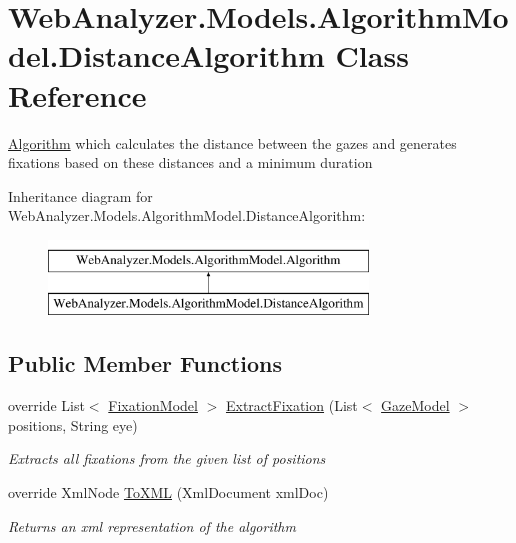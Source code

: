 \hypertarget{class_web_analyzer_1_1_models_1_1_algorithm_model_1_1_distance_algorithm}{}\section{Web\+Analyzer.\+Models.\+Algorithm\+Model.\+Distance\+Algorithm Class Reference}
\label{class_web_analyzer_1_1_models_1_1_algorithm_model_1_1_distance_algorithm}


\hyperlink{class_web_analyzer_1_1_models_1_1_algorithm_model_1_1_algorithm}{Algorithm} which calculates the distance between the gazes and generates fixations based on these distances and a minimum duration  


Inheritance diagram for Web\+Analyzer.\+Models.\+Algorithm\+Model.\+Distance\+Algorithm\+:\begin{figure}[H]
\begin{center}
\leavevmode
\includegraphics[height=2.000000cm]{class_web_analyzer_1_1_models_1_1_algorithm_model_1_1_distance_algorithm}
\end{center}
\end{figure}
\subsection*{Public Member Functions}
\begin{DoxyCompactItemize}
\item 
override List$<$ \hyperlink{class_web_analyzer_1_1_models_1_1_analysis_model_1_1_fixation_model}{Fixation\+Model} $>$ \hyperlink{class_web_analyzer_1_1_models_1_1_algorithm_model_1_1_distance_algorithm_ab8e0d7ad96104e40eb8079d180d1aa0c}{Extract\+Fixation} (List$<$ \hyperlink{class_web_analyzer_1_1_models_1_1_data_model_1_1_gaze_model}{Gaze\+Model} $>$ positions, String eye)
\begin{DoxyCompactList}\small\item\em Extracts all fixations from the given list of positions \end{DoxyCompactList}\item 
override Xml\+Node \hyperlink{class_web_analyzer_1_1_models_1_1_algorithm_model_1_1_distance_algorithm_ad5882c45e12a53507c8c9ac86ad94776}{To\+X\+M\+L} (Xml\+Document xml\+Doc)
\begin{DoxyCompactList}\small\item\em Returns an xml representation of the algorithm \end{DoxyCompactList}\end{DoxyCompactItemize}
